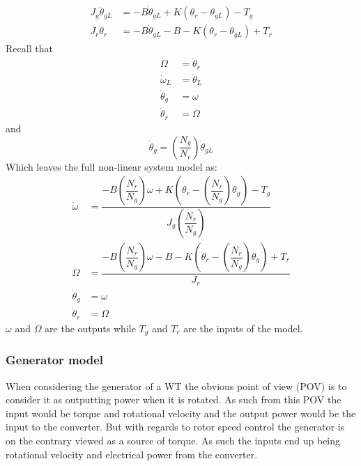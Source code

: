 \begin{align} 
	J_{g} \ddot{\theta}_{gL} & = -B \dot{\theta}_{gL} + K(\theta_r - \theta_{gL}) - T_{g} \label{eq:wtlin_comp_drivetrain_flex_1} \\
	J_{r} \ddot{\theta}_r & = -B \dot{\theta}_{gL} -B - K(\theta_r - \theta_{gL}) + T_{r} \label{eq:wtlin_comp_drivetrain_flex_2}
\end{align}
Recall that
\begin{align}
	\dot{\Omega} & = \ddot{\theta}_r \\
	\dot{\omega}_{L} & = \ddot{\theta}_{L} \\
	\dot{\theta}_g & = \omega \\
	\dot{\theta}_r & = \Omega
\end{align}
and
\begin{equation}\label{eq:wtlin_comp_drivetrain_flex_mod_3}
	\dot{\theta}_g = \left(\dfrac{N_g}{N_r}\right) \dot{\theta}_{gL} 
\end{equation}
Which leaves the full non-linear system model as:
\begin{align} 
	\dot{\omega} & = \dfrac{-B \left(\dfrac{N_r}{N_g}\right)\omega + K(\theta_r - \left(\dfrac{N_r}{N_g}\right) \theta_{g}) - T_{g}}{J_{g} \left(\dfrac{N_r}{N_g}\right) } \label{eq:wtlin_comp_drivetrain_flex_mod_1} \\
	\dot{\Omega} & = \dfrac{-B \left(\dfrac{N_r}{N_g}\right) \omega -B - K(\theta_r - \left(\dfrac{N_r}{N_g}\right) \theta_{g}) + T_{r}}{J_{r}} \label{eq:wtlin_comp_drivetrain_flex_mod_2} \\
	\dot{\theta}_g & = \omega \\
	\dot{\theta}_r & = \Omega
\end{align}
$ \omega $ and $ \Omega $ are the outputs while $ T_g $ and $ T_r $ are the inputs of the model.
	

\subsubsection{Generator model}
When considering the generator of a WT the obvious point of view (POV) is to consider it as outputting power when it is rotated. As such from this POV the input would be torque and rotational velocity and the output power would be the input to the converter. But with regards to rotor speed control the generator is on the contrary viewed as a source of torque. As such the inputs end up being rotational velocity and electrical power from the converter.

